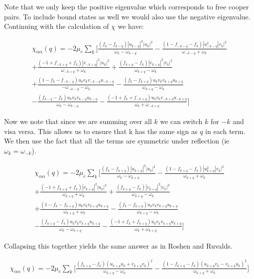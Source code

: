\documentclass{article}
\begin{document}
Note that we only keep the positive eigenvalue which corresponds to free cooper pairs. To include bound states as well we would also use the negative eigenvalue. Continuing with the calculation of $\chi$ we have:

\begin{align*}
\chi_{\alpha\alpha}(q)=-2\mu_e\sum\limits_{k}\bigg[\frac{(f_{k}-f_{k-q})|u_{k-q}|^2|u_k|^2}{\omega_{k}-\omega_{k-q}}
-\frac{(1-f_{-k-q}-f_{k})|u_{-k-q}^2|v_k|^2}{\omega_{-k-q}+\omega_{k}} \\
+\frac{(-1+f_{-k+q}+f_{k})|v_{-k+q}|^2|u_k|^2}{\omega_{-k+q}+\omega_{k}} 
+\frac{(f_{k+q}-f_{k})|v_{k+q}|^2|v_k|^2}{\omega_{k+q}-\omega_{k}} \\
+\frac{(1-f_{k}-f_{-k-q})u_kv_kv_{-k-q}u_{-k-q}}{-\omega_{-k-q}-\omega_{k}}
-\frac{(f_{k}-f_{k+q})u_kv_kv_{k+q}u_{k+q}}{\omega_{k+q}-\omega_{k}} \\
-\frac{(f_{k-q}-f_{k})u_kv_kv_{k-q}u_{k-q}}{\omega_{k}-\omega_{k-q}}
-\frac{(-1+f_{k}+f_{-k+q})u_kv_kv_{-k+q}u_{-k+q}}{\omega_{k}+\omega_{-k+q}}\bigg]
\end{align*}

Now we note that since we are summing over all $k$ we can switch $k$ for $-k$ and visa versa. This allows us to ensure that k has the same sign as $q$ in each term. We then use the fact that all the terms are symmetric under reflection (ie $\omega_k=\omega_{-k}$).

\begin{align*}
\chi_{\alpha\alpha}(q)=-2\mu_e\sum\limits_{k}\bigg[\frac{(f_{k}-f_{k+q})|u_{k+q}|^2|u_k|^2}{\omega_{k}-\omega_{k+q}}
-\frac{(1-f_{k+q}-f_{k})|u_{k+q}^2|v_k|^2}{\omega_{k+q}+\omega_{k}} \\
+\frac{(-1+f_{k+q}+f_{k})|v_{k+q}|^2|u_k|^2}{\omega_{k+q}+\omega_{k}} 
+\frac{(f_{k+q}-f_{k})|v_{k+q}|^2|v_k|^2}{\omega_{k+q}-\omega_{k}} \\
+\frac{(1-f_{k}-f_{k+q})u_kv_kv_{k+q}u_{k+q}}{\omega_{k+q}+\omega_{k}}
-\frac{(f_{k}-f_{k+q})u_kv_kv_{k+q}u_{k+q}}{\omega_{k+q}-\omega_{k}} \\
-\frac{(f_{k+q}-f_{k})u_kv_kv_{k+q}u_{k+q}}{\omega_{k}-\omega_{k+q}}
-\frac{(-1+f_{k}+f_{k+q})u_kv_kv_{k+q}u_{k+q}}{\omega_{k}+\omega_{k+q}}\bigg]
\end{align*}

Collapsing this together yields the same answer as in Roshen and Ruvalds.

\begin{align*}
\chi_{\alpha\alpha}(q)=-2\mu_e\sum\limits_{k}\bigg[\frac{(f_{k+q}-f_{k})(u_{k+q}u_k+v_{k+q}v_k)^2}{\omega_{k+q}-\omega_{k}}
-\frac{(1-f_{k+q}-f_{k})(u_{k+q}v_k-v_{k+q}u_k)^2}{\omega_{k+q}+\omega_{k}} \bigg]
\end{align*}
\end{document}
